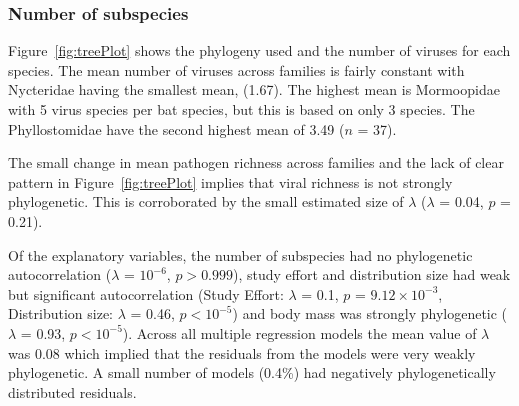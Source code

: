 \subsubsection{Number of subspecies}

Figure~\ref{fig:treePlot} shows the phylogeny used and the number of viruses for each species.
The mean number of viruses across families is fairly constant with Nycteridae having the smallest mean, (1.67).
The highest mean is Mormoopidae with 5 virus species per bat species, but this is based on only 3 species.
The Phyllostomidae have the second highest mean  of 3.49 ($n$ = 37).



The small change in mean pathogen richness across families and the lack of clear pattern in Figure~\ref{fig:treePlot} implies that viral richness is not strongly phylogenetic. 
This is corroborated by the small estimated size of $\lambda$ ($\lambda$ = 0.04, $p$ = 0.21).

Of the explanatory variables, the number of subspecies had no phylogenetic autocorrelation ($\lambda$ = \ensuremath{10^{-6}}, $p > 0.999$), study effort and distribution size had weak but significant autocorrelation (Study Effort: $\lambda$ = 0.1, $p$ = \ensuremath{9.12\times 10^{-3}}, Distribution size: $\lambda$ = 0.46, $p < 10^{-5}$) and body mass was strongly phylogenetic ($\lambda$ = 0.93, $p < 10^{-5}$). 
Across all multiple regression models the mean value of $\lambda$ was 0.08 which implied that the residuals from the models were very weakly phylogenetic.
A small number of models (0.4\%)  had negatively phylogenetically distributed residuals.


